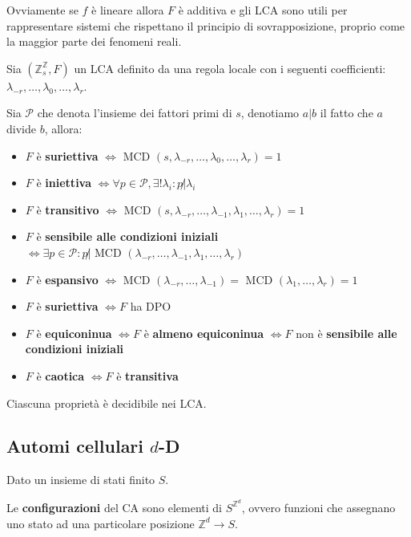 Ovviamente se $f$ è lineare allora $F$ è additiva e gli LCA sono utili per rappresentare
sistemi che rispettano il principio di sovrapposizione, proprio come la maggior parte
dei fenomeni reali.

\begin{teorema}
    Sia $(\mathbb{Z}_s^\mathbb{Z}, F)$ un LCA definito da una regola locale con i
    seguenti coefficienti: $\lambda_{-r}, \dots,\lambda_0,\dots,\lambda_r$.

    Sia $\mathcal{P}$ che denota l'insieme dei fattori primi di $s$, denotiamo $a|b$
    il fatto che $a$ divide $b$, allora:
    \begin{itemize}
        \item $F$ è \textbf{suriettiva} $\iff\text{ MCD }(s,\lambda_{-r}, \dots,\lambda_0,\dots,\lambda_r) = 1$
        \item $F$ è \textbf{iniettiva} $\iff \forall p\in \mathcal{P}, \exists !\lambda_i: p\not |\lambda_i$
        \item $F$ è \textbf{transitivo} $\iff\text{ MCD }(s,\lambda_{-r}, \dots,\lambda_{-1},\lambda_{1},\dots,\lambda_r) = 1$
        \item $F$ è \textbf{sensibile alle condizioni iniziali} $\iff \exists  p\in \mathcal{P}: p\not |\text{ MCD }(\lambda_{-r}, \dots,\lambda_{-1},\lambda_{1},\dots,\lambda_r) $
        \item $F$ è \textbf{espansivo} $\iff \text{ MCD }(\lambda_{-r}, \dots,\lambda_{-1})=\text{ MCD }(\lambda_{1},\dots,\lambda_r)=1 $
        \item $F$ è \textbf{suriettiva} $\iff F$ ha DPO
        \item $F$ è \textbf{equiconinua} $\iff F$ è \textbf{almeno equiconinua} $\iff F$ non è \textbf{sensibile alle condizioni iniziali}
        \item $F$ è \textbf{caotica} $\iff F$ è \textbf{transitiva}
    \end{itemize}
\end{teorema}

\begin{teorema}
    Ciascuna proprietà è decidibile nei LCA.
\end{teorema}

\subsection{Automi cellulari $d$-D}
Dato un insieme di stati finito $S$.

\begin{definizione}
    Le \textbf{configurazioni} del CA sono elementi di $S^{\mathbb{Z}^d}$, ovvero
    funzioni che assegnano uno stato ad una particolare posizione $\mathbb{Z}^d\rightarrow S$.
\end{definizione}


